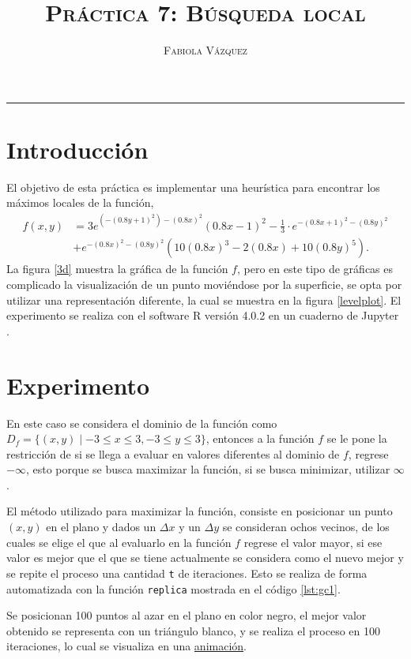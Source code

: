 \documentclass[12pt,letterpaper]{article}
\title{\textsc{Práctica 7: Búsqueda local}}
\author{\textsc{Fabiola Vázquez}}
\begin{document}
\maketitle

\hrule
\section{Introducción}
El objetivo de esta práctica \cite{elisapractica7} es implementar una heurística para encontrar los máximos locales de la función, 
\begin{align*}
f(x,y) &= 3e^{(-(0.8y + 1)^2)-(0.8x)^2}(0.8x-1)^2 - \frac{1}{3}\cdot e^{-(0.8x+1)^2-(0.8y)^2}\\ &+e^{-(0.8x)^2-(0.8y)^2}(10(0.8x)^3-2(0.8x)+10(0.8y)^5).
\end{align*}
La figura \ref{3d} muestra la gráfica de la función $f$, pero en este tipo de gráficas es complicado la visualización de un punto moviéndose por la superficie, se opta por utilizar una representación diferente, la cual se muestra en la figura \ref{levelplot}.  El  experimento se realiza con el software R versión 4.0.2  \cite{R} en un cuaderno de Jupyter \cite{jupyter}.



\section{Experimento}
En este caso se considera el dominio de la función como $D_f = \{(x,y) \mid -3\leqslant x \leqslant 3, -3\leqslant y \leqslant 3\}$, entonces a la función $f$ se le pone la restricción de si se llega a evaluar en valores diferentes al dominio de $f$, regrese $-\infty$, esto porque se busca maximizar la función, si se busca minimizar, utilizar $\infty$.

El método utilizado para maximizar la función, consiste en posicionar un punto $(x,y)$ en el plano y dados un $\Delta x$ y un $\Delta y$ se consideran ochos vecinos, de los cuales se elige el que al evaluarlo en la función $f$ regrese el valor mayor, si ese valor es mejor que el que se tiene actualmente se considera como el nuevo mejor y se repite el proceso una cantidad \texttt{t} de iteraciones. Esto se realiza de forma automatizada con la función \texttt{replica} mostrada en el código \ref{lst:gc1}.

Se posicionan 100 puntos al azar en el plano en color negro, el mejor valor obtenido se representa con un triángulo blanco, y se realiza el proceso en 100 iteraciones, lo cual se visualiza en una \href{https://github.com/fvzqa/Simulacion/blob/master/Tarea7/Animaciones/imagen1.gif}{animación}.
\end{document}
